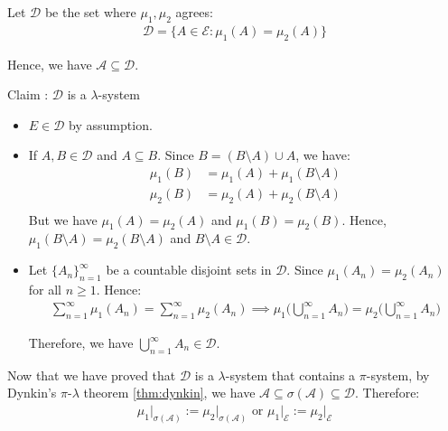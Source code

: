 \begin{proof*}
    Let $\mathcal{D}$ be the set where $\mu_1, \mu_2$ agrees:
    \begin{align*}
        \mathcal{D} = \Big\{ A \in \mathcal{E} : \mu_1(A) = \mu_2(A) \Big\}
    \end{align*}

    \noindent\newline Hence, we have $\mathcal{A}\subseteq \mathcal{D}$.

    \begin{subproof}{\newline Claim : $\mathcal{D}$ is a $\lambda$-system}
        \begin{itemize}
            \item $E \in \mathcal{D}$ by assumption.
            \item If $A, B\in\mathcal{D}$ and $A \subseteq B$. Since $B = (B\setminus A) \cup A$, we have:
            \begin{align*}
                \mu_1(B) &= \mu_1(A) + \mu_1(B \setminus A) \\
                \mu_2(B) &= \mu_2(A) + \mu_2(B \setminus A) \\
            \end{align*}
            \noindent But we have $\mu_1(A)=\mu_2(A)$ and $\mu_1(B)=\mu_2(B)$. Hence, $\mu_1(B\setminus A) = \mu_2(B\setminus A)$ and $B\setminus A \in \mathcal{D}$.

            \item Let $\{A_n\}_{n=1}^\infty$ be a countable disjoint sets in $\mathcal{D}$. Since $\mu_1(A_n)=\mu_2(A_n)$ for all $n\ge 1$. Hence:
            \begin{align*}
                \sum_{n=1}^\infty \mu_1(A_n) = \sum_{n=1}^\infty \mu_2(A_n) \implies \mu_1\Bigg( \bigcup_{n=1}^\infty A_n \Bigg) = \mu_2\Bigg( \bigcup_{n=1}^\infty A_n \Bigg)
            \end{align*}

            \noindent Therefore, we have $\bigcup_{n=1}^\infty A_n \in \mathcal{D}$.
        \end{itemize}
    \end{subproof}

    \noindent\newline Now that we have proved that $\mathcal{D}$ is a $\lambda$-system that contains a $\pi$-system, by Dynkin's $\pi$-$\lambda$ theorem \ref{thm:dynkin}, we have $\mathcal{A}\subseteq\sigma(\mathcal{A})\subseteq\mathcal{D}$. Therefore:
    \begin{align*}
        \mu_1\Big|_{\sigma(\mathcal{A})} := \mu_2\Big|_{\sigma(\mathcal{A})} \text{ or } \mu_1\Big|_{\mathcal{E}} := \mu_2\Big|_{\mathcal{E}}
    \end{align*}
\end{proof*}

